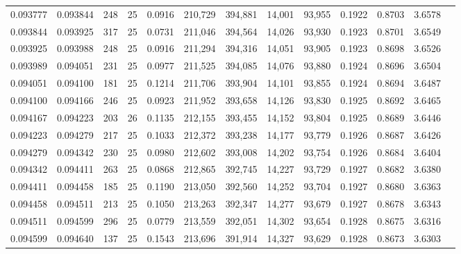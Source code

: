 \begin{tabular}{rrrrrrrrrrrrr}
0.093777 & 0.093844 &   248 &  25 &                                     0.0916 & 210,729 & 394,881 &  14,001 &  93,955 & 0.1922 & 0.8703 & 3.6578 \\
0.093844 & 0.093925 &   317 &  25 &                                     0.0731 & 211,046 & 394,564 &  14,026 &  93,930 & 0.1923 & 0.8701 & 3.6549 \\
0.093925 & 0.093988 &   248 &  25 &                                     0.0916 & 211,294 & 394,316 &  14,051 &  93,905 & 0.1923 & 0.8698 & 3.6526 \\
0.093989 & 0.094051 &   231 &  25 &                                     0.0977 & 211,525 & 394,085 &  14,076 &  93,880 & 0.1924 & 0.8696 & 3.6504 \\
0.094051 & 0.094100 &   181 &  25 &                                     0.1214 & 211,706 & 393,904 &  14,101 &  93,855 & 0.1924 & 0.8694 & 3.6487 \\
0.094100 & 0.094166 &   246 &  25 &                                     0.0923 & 211,952 & 393,658 &  14,126 &  93,830 & 0.1925 & 0.8692 & 3.6465 \\
0.094167 & 0.094223 &   203 &  26 &                                     0.1135 & 212,155 & 393,455 &  14,152 &  93,804 & 0.1925 & 0.8689 & 3.6446 \\
0.094223 & 0.094279 &   217 &  25 &                                     0.1033 & 212,372 & 393,238 &  14,177 &  93,779 & 0.1926 & 0.8687 & 3.6426 \\
0.094279 & 0.094342 &   230 &  25 &                                     0.0980 & 212,602 & 393,008 &  14,202 &  93,754 & 0.1926 & 0.8684 & 3.6404 \\
0.094342 & 0.094411 &   263 &  25 &                                     0.0868 & 212,865 & 392,745 &  14,227 &  93,729 & 0.1927 & 0.8682 & 3.6380 \\
0.094411 & 0.094458 &   185 &  25 &                                     0.1190 & 213,050 & 392,560 &  14,252 &  93,704 & 0.1927 & 0.8680 & 3.6363 \\
0.094458 & 0.094511 &   213 &  25 &                                     0.1050 & 213,263 & 392,347 &  14,277 &  93,679 & 0.1927 & 0.8678 & 3.6343 \\
0.094511 & 0.094599 &   296 &  25 &                                     0.0779 & 213,559 & 392,051 &  14,302 &  93,654 & 0.1928 & 0.8675 & 3.6316 \\
0.094599 & 0.094640 &   137 &  25 &                                     0.1543 & 213,696 & 391,914 &  14,327 &  93,629 & 0.1928 & 0.8673 & 3.6303 \\

\end{tabular}
